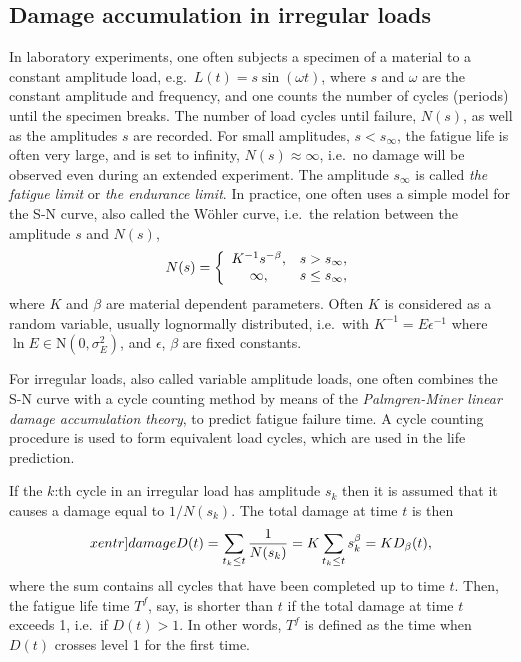 \subsection{Damage accumulation in irregular loads}
\label{sec:fatigueprediction}
In laboratory experiments, one often subjects a specimen of a material
to a constant amplitude load, e.g.\
$L(t)= s \sin(\omega t)$,
where $s$ and $\omega$ are the constant amplitude and
frequency, and one counts the number of cycles
(periods) until the specimen breaks. The number of load cycles until failure, $N(s)$,
as well as the amplitudes $s$ are
recorded. For small amplitudes, $s<s_{\infty}$,
the fatigue life is often very large, and is set to infinity,
$N(s)\approx\infty$, i.e.\ no
damage will be observed even during an extended experiment.
The amplitude $s_{\infty}$ is called
\emph{the fatigue limit} or
\emph{the endurance limit}.
In practice, one often uses a simple model for the S-N curve,
also called the W{\" o}hler curve, i.e.\
the relation between 
the amplitude $s$ and $N(s)$,
\begin{equation} \label{eq:SNmodel}
   N(s)=\left\{ \begin{array}{c@{\quad}l}
        K^{-1} s^{-\beta}, & s> s_{\infty},\\
        \infty, & s\le s_{\infty},\end{array}\right.
        \end{equation}
where $K$ and $\beta$ are material dependent parameters.
Often $K$ is considered as a random variable, usually
lognormally distributed, i.e.\ with $K^{-1}=E\epsilon^{-1}$ where
$\ln E \in\mbox{N}(0,\sigma_E^2)$,
and $\epsilon$, $\beta$ are fixed constants.

For irregular loads, also called variable amplitude loads, one
often combines the S-N curve with a cycle counting method by
means of the \emph{Palmgren-Miner linear damage accumulation theory},
\index[xentr]{Palmgren-Miner rule}
to predict fatigue failure time. A cycle counting procedure is used
to form equivalent load cycles, which are used in the life prediction.

If the $k$:th cycle in an irregular load has amplitude $s_k$ then it is assumed that
it causes a damage equal to $1/N(s_k)$. The total damage at time $t$ is
then
\begin{equation} \label{eq:Damage}\index[xentr]{damage}
  D(t)=\sum_{t_k\le t}\frac{1}{N(s_k)}=K\sum_{t_k\le
  t}s_k^\beta=K D_\beta(t),
\end{equation}
where the sum contains all cycles that have been completed
up to time $t$. Then, the fatigue life time $T^f$, say, is shorter
than $t$ if the total damage at time $t$ exceeds 1, i.e.\ if $D(t)>1$.
In other words, $T^f$ is defined as the time when $D(t)$ crosses level
1 for the first time.

